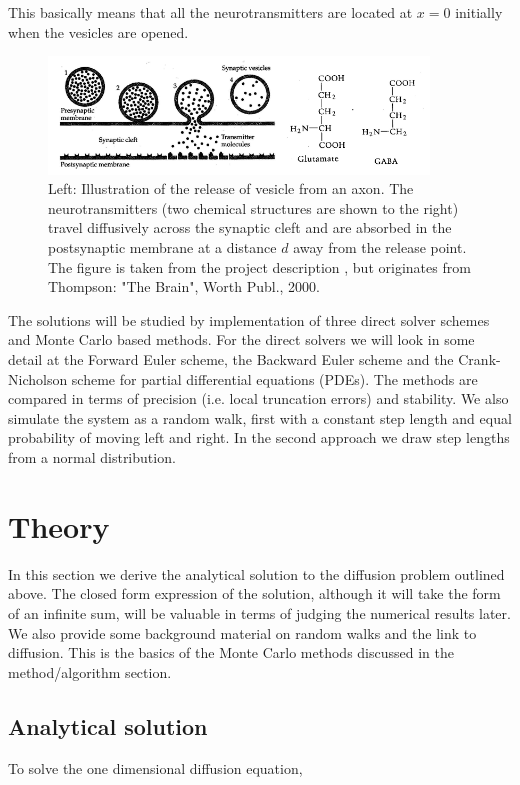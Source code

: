 \documentclass[a4paper, 11pt, notitlepage,english]{article}
\begin{document}
This basically means that all the neurotransmitters are located at $x=0$ initially when the vesicles are opened. \\

\begin{figure}[h!tb]
 \centering
 \includegraphics[width=0.9\textwidth]{Synaptic_cleft_project}
 \caption{Left: Illustration of the release of vesicle from an axon. The neurotransmitters (two chemical structures are shown to the right) travel diffusively across the synaptic cleft and are absorbed in the postsynaptic membrane at a distance $d$ away from the release point. The figure is taken from the project description \cite{Komp3150}, but originates from Thompson: "The Brain", Worth Publ., 2000.}
\label{fig:Synaptic_cleft}
\end{figure}

The solutions will be studied by implementation of three direct solver schemes and Monte Carlo based methods. For the direct solvers we will look in some detail at the Forward Euler scheme, the Backward Euler scheme and the Crank-Nicholson scheme for partial differential equations (PDEs). The methods are compared in terms of precision (i.e. local truncation errors) and stability. We also simulate the system as a random walk, first with a constant step length and equal probability of moving left and right. In the second approach we draw step lengths from a normal distribution. 

\section{Theory}
In this section we derive the analytical solution to the diffusion problem outlined above. The closed form expression of the solution, although it will take the form of an infinite sum, will be valuable in terms of judging the numerical results later. We also provide some background material on random walks and the link to diffusion. This is the basics of the Monte Carlo methods discussed in the method/algorithm section.

\subsection{Analytical solution}
To solve the one dimensional diffusion equation, 
\end{document}
